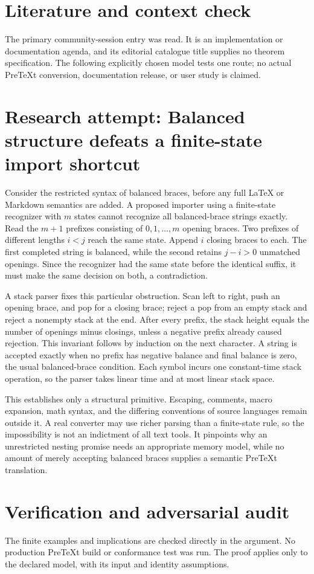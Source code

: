 \documentclass[11pt]{article}
\begin{document}
\section{Literature and context check}
The primary community-session entry was read. It is an implementation or documentation agenda, and its editorial catalogue title supplies no theorem specification. The following explicitly chosen model tests one route; no actual PreTeXt conversion, documentation release, or user study is claimed.
\section{Research attempt: Balanced structure defeats a finite-state import shortcut}
Consider the restricted syntax of balanced braces, before any full LaTeX or Markdown semantics are added. A proposed importer using a finite-state recognizer with $m$ states cannot recognize all balanced-brace strings exactly. Read the $m+1$ prefixes consisting of $0,1,\ldots,m$ opening braces. Two prefixes of different lengths $i<j$ reach the same state. Append $i$ closing braces to each. The first completed string is balanced, while the second retains $j-i>0$ unmatched openings. Since the recognizer had the same state before the identical suffix, it must make the same decision on both, a contradiction.

A stack parser fixes this particular obstruction. Scan left to right, push an opening brace, and pop for a closing brace; reject a pop from an empty stack and reject a nonempty stack at the end. After every prefix, the stack height equals the number of openings minus closings, unless a negative prefix already caused rejection. This invariant follows by induction on the next character. A string is accepted exactly when no prefix has negative balance and final balance is zero, the usual balanced-brace condition. Each symbol incurs one constant-time stack operation, so the parser takes linear time and at most linear stack space.

This establishes only a structural primitive. Escaping, comments, macro expansion, math syntax, and the differing conventions of source languages remain outside it. A real converter may use richer parsing than a finite-state rule, so the impossibility is not an indictment of all text tools. It pinpoints why an unrestricted nesting promise needs an appropriate memory model, while no amount of merely accepting balanced braces supplies a semantic PreTeXt translation.
\section{Verification and adversarial audit}
The finite examples and implications are checked directly in the argument. No production PreTeXt build or conformance test was run. The proof applies only to the declared model, with its input and identity assumptions.
\end{document}
